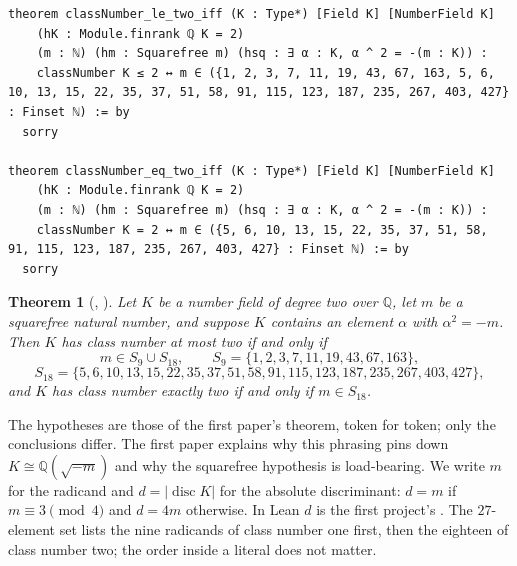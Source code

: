 \documentclass[11pt]{article}
\newtheorem{theorem}{Theorem}[section]
\theoremstyle{definition}
\newcommand{\Q}{\mathbb{Q}}
\newcommand{\disc}{\operatorname{disc}}
\begin{document}
\begin{lstlisting}
theorem classNumber_le_two_iff (K : Type*) [Field K] [NumberField K]
    (hK : Module.finrank ℚ K = 2)
    (m : ℕ) (hm : Squarefree m) (hsq : ∃ α : K, α ^ 2 = -(m : K)) :
    classNumber K ≤ 2 ↔ m ∈ ({1, 2, 3, 7, 11, 19, 43, 67, 163, 5, 6, 10, 13, 15, 22, 35, 37, 51, 58, 91, 115, 123, 187, 235, 267, 403, 427} : Finset ℕ) := by
  sorry

theorem classNumber_eq_two_iff (K : Type*) [Field K] [NumberField K]
    (hK : Module.finrank ℚ K = 2)
    (m : ℕ) (hm : Squarefree m) (hsq : ∃ α : K, α ^ 2 = -(m : K)) :
    classNumber K = 2 ↔ m ∈ ({5, 6, 10, 13, 15, 22, 35, 37, 51, 58, 91, 115, 123, 187, 235, 267, 403, 427} : Finset ℕ) := by
  sorry
\end{lstlisting}

\begin{theorem}[, ]\label{thm:main}
Let $K$ be a number field of degree two over $\Q$, let $m$ be a squarefree natural number, and suppose $K$ contains an element $\alpha$ with $\alpha^2 = -m$. Then $K$ has class number at most two if and only if
\[
m \in S_9 \cup S_{18}, \qquad S_9 = \{1, 2, 3, 7, 11, 19, 43, 67, 163\},
\]
\[
S_{18} = \{5, 6, 10, 13, 15, 22, 35, 37, 51, 58, 91, 115, 123, 187, 235, 267, 403, 427\},
\]
and $K$ has class number exactly two if and only if $m \in S_{18}$.
\end{theorem}

The hypotheses are those of the first paper's theorem, token for token; only the conclusions differ. The first paper explains why this phrasing pins down $K \cong \Q(\sqrt{-m})$ and why the squarefree hypothesis is load-bearing. We write $m$ for the radicand and $d = |\disc K|$ for the absolute discriminant: $d = m$ if $m \equiv 3 \pmod 4$ and $d = 4m$ otherwise. In Lean $d$ is the first project's . The $27$-element set lists the nine radicands of class number one first, then the eighteen of class number two; the order inside a  literal does not matter.
\end{document}
